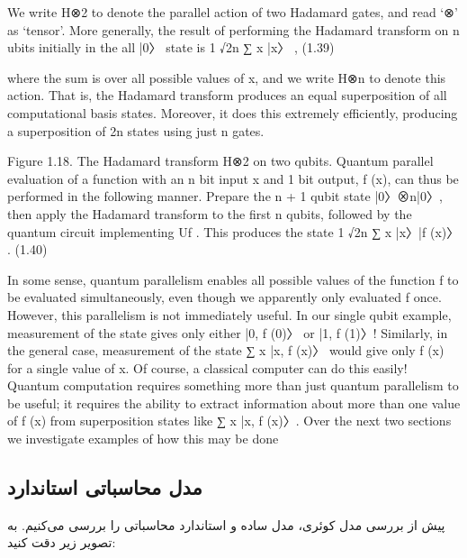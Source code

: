 \documentclass{book}
\begin{document}
 We write H⊗2 to denote the parallel action of two Hadamard gates, and read
‘⊗’ as ‘tensor’. More generally, the result of performing the Hadamard transform on n
ubits initially in the all |0〉 state is
1
√2n
∑
x
|x〉 , (1.39)




where the sum is over all possible values of x, and we write H⊗n to denote this action.
That is, the Hadamard transform produces an equal superposition of all computational
basis states. Moreover, it does this extremely efficiently, producing a superposition of 2n
states using just n gates.



Figure 1.18. The Hadamard transform H⊗2 on two qubits.
Quantum parallel evaluation of a function with an n bit input x and 1 bit output, f (x),
can thus be performed in the following manner. Prepare the n + 1 qubit state |0〉⊗n|0〉,
then apply the Hadamard transform to the first n qubits, followed by the quantum circuit
implementing Uf . This produces the state
1
√2n
∑
x
|x〉|f (x)〉 . (1.40)






In some sense, quantum parallelism enables all possible values of the function f to be
evaluated simultaneously, even though we apparently only evaluated f once. However,
this parallelism is not immediately useful. In our single qubit example, measurement of the
state gives only either |0, f (0)〉 or |1, f (1)〉! Similarly, in the general case, measurement of
the state ∑
x |x, f (x)〉 would give only f (x) for a single value of x. Of course, a classical
computer can do this easily! Quantum computation requires something more than just
quantum parallelism to be useful; it requires the ability to extract information about more
than one value of f (x) from superposition states like ∑
x |x, f (x)〉. Over the next two
sections we investigate examples of how this may be done








\newpage
\subsection{مدل محاسباتی استاندارد}
پیش از بررسی مدل کوئری،‌ مدل ساده و استاندارد محاسباتی را بررسی می‌کنیم. به تصویر زیر دقت کنید:
\end{document}
